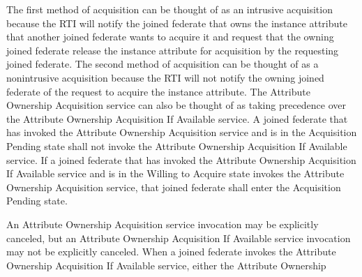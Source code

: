 \begin{compactstdpage}


    The first method of acquisition can be thought of as an intrusive acquisition because the RTI will notify the joined federate that owns the instance attribute that another joined federate wants to acquire it and request that the owning joined federate release the instance attribute for acquisition by the requesting joined federate. The second method of acquisition can be thought of as a nonintrusive acquisition because the RTI will not notify the owning joined federate of the request to acquire the instance attribute. The Attribute Ownership Acquisition service can also be thought of as taking precedence over the Attribute Ownership Acquisition If Available service. A joined federate that has invoked the Attribute Ownership Acquisition service and is in the Acquisition Pending state shall not invoke the Attribute Ownership Acquisition If Available service. If a joined federate that has invoked the Attribute Ownership Acquisition If Available service and is in the Willing to Acquire state invokes the Attribute Ownership Acquisition service, that joined federate shall enter the Acquisition Pending state.


    An Attribute Ownership Acquisition service invocation may be explicitly canceled, but an Attribute Ownership Acquisition If Available service invocation may not be explicitly canceled. When a joined federate invokes the Attribute Ownership Acquisition If Available service, either the Attribute Ownership

\end{compactstdpage}

\clearpage

